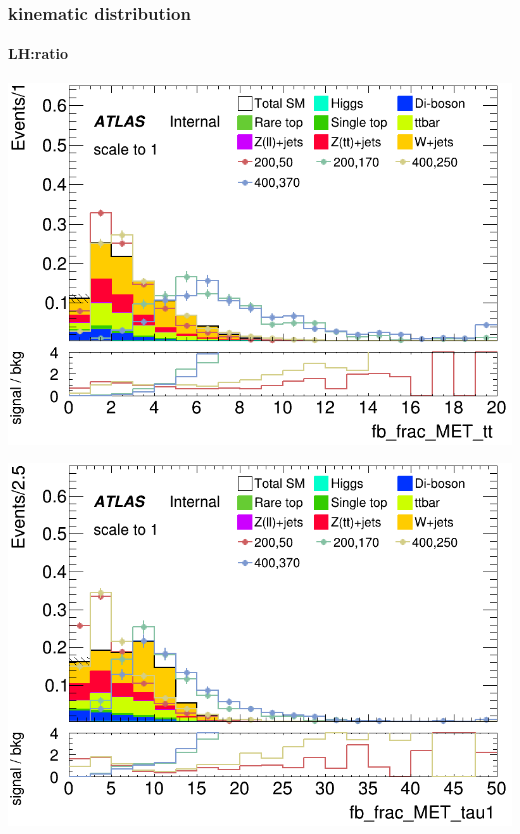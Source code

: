 \documentclass[usenames,dvipsnames]{beamer}
\begin{document}
\begin{frame}
	\frametitle{kinematic distribution}
	\framesubtitle{LH:ratio}
    \begin{minipage}{0.32\textwidth}
        \centering
        \includegraphics[width=\textwidth]{graphics/LH_met_sig/LH_fb_frac_MET_tt_norm.png}
    \end{minipage}
    \hfill
    \begin{minipage}{0.32\textwidth}
        \centering
        \includegraphics[width=\textwidth]{graphics/LH_met_sig/LH_fb_frac_MET_tau1_norm.png}
    \end{minipage}
    \hfill
    \begin{minipage}{0.32\textwidth}
        \centering

\end{minipage}
\end{frame}
\end{document}
